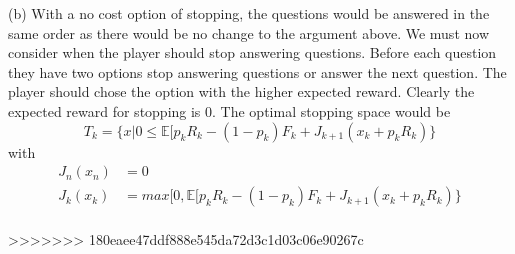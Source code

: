 \documentclass[11pt, oneside]{article}   	%
\begin{document}
(b) With a no cost option of stopping, the questions would be answered in the same order as there would be no change to the argument above. We must now consider when the player should stop answering questions. Before each question they have two options stop answering questions or answer the next question. The player should chose the option with the higher expected reward. Clearly the expected reward for stopping is 0. The optimal stopping space would be
$$T_{k}=\{x|0 \leq  \mathbb{E}[p_{k}R_{k}-(1-p_{k})F_{k} + J_{k+1}(x_{k}+p_{k}R_{k} ) \}$$
with
\begin{align*}
J_{n}(x_{n}) &= 0\\
J_{k}(x_{k}) &= max[0, \mathbb{E}[p_{k}R_{k}-(1-p_{k})F_{k} + J_{k+1}(x_{k}+p_{k}R_{k} ) \}\\
\end{align*}

>>>>>>> 180eaee47ddf888e545da72d3c1d03c06e90267c
\end{document}
